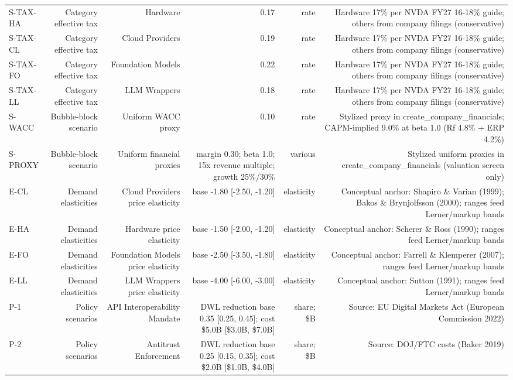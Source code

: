 \begin{tabular}{@{}lrrrrr@{}}
S-TAX-HA & Category effective tax & Hardware & 0.17 & rate & Hardware 17\% per NVDA FY27 16-18\% guide; others from company filings (conservative) \\
S-TAX-CL & Category effective tax & Cloud Providers & 0.19 & rate & Hardware 17\% per NVDA FY27 16-18\% guide; others from company filings (conservative) \\
S-TAX-FO & Category effective tax & Foundation Models & 0.22 & rate & Hardware 17\% per NVDA FY27 16-18\% guide; others from company filings (conservative) \\
S-TAX-LL & Category effective tax & LLM Wrappers & 0.18 & rate & Hardware 17\% per NVDA FY27 16-18\% guide; others from company filings (conservative) \\
S-WACC & Bubble-block scenario & Uniform WACC proxy & 0.10 & rate & Stylized proxy in create\_company\_financials; CAPM-implied 9.0\% at beta 1.0 (Rf 4.8\% + ERP 4.2\%) \\
S-PROXY & Bubble-block scenario & Uniform financial proxies & margin 0.30; beta 1.0; 15x revenue multiple; growth 25\%/30\% & various & Stylized uniform proxies in create\_company\_financials (valuation screen only) \\
E-CL & Demand elasticities & Cloud Providers price elasticity & base -1.80 [-2.50, -1.20] & elasticity & Conceptual anchor: Shapiro \& Varian (1999); Bakos \& Brynjolfsson (2000); ranges feed Lerner/markup bands \\
E-HA & Demand elasticities & Hardware price elasticity & base -1.50 [-2.00, -1.20] & elasticity & Conceptual anchor: Scherer \& Ross (1990); ranges feed Lerner/markup bands \\
E-FO & Demand elasticities & Foundation Models price elasticity & base -2.50 [-3.50, -1.80] & elasticity & Conceptual anchor: Farrell \& Klemperer (2007); ranges feed Lerner/markup bands \\
E-LL & Demand elasticities & LLM Wrappers price elasticity & base -4.00 [-6.00, -3.00] & elasticity & Conceptual anchor: Sutton (1991); ranges feed Lerner/markup bands \\
P-1 & Policy scenarios & API Interoperability Mandate & DWL reduction base 0.35 [0.25, 0.45]; cost \$5.0B [\$3.0B, \$7.0B] & share; \$B & Source: EU Digital Markets Act (European Commission 2022) \\
P-2 & Policy scenarios & Antitrust Enforcement & DWL reduction base 0.25 [0.15, 0.35]; cost \$2.0B [\$1.0B, \$4.0B] & share; \$B & Source: DOJ/FTC costs (Baker 2019) \\

\end{tabular}
